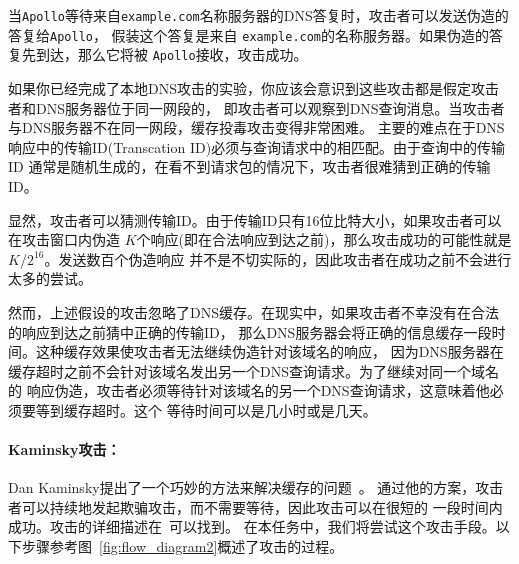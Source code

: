 当{\tt Apollo}等待来自{\tt example.com}名称服务器的DNS答复时，攻击者可以发送伪造的答复给{\tt Apollo}，
假装这个答复是来自 {\tt example.com}的名称服务器。如果伪造的答复先到达，那么它将被
{\tt Apollo}接收，攻击成功。


如果你已经完成了本地DNS攻击的实验，你应该会意识到这些攻击都是假定攻击者和DNS服务器位于同一网段的，
即攻击者可以观察到DNS查询消息。当攻击者与DNS服务器不在同一网段，缓存投毒攻击变得非常困难。
主要的难点在于DNS响应中的传输ID(Transcation ID)必须与查询请求中的相匹配。由于查询中的传输ID
通常是随机生成的，在看不到请求包的情况下，攻击者很难猜到正确的传输ID。


显然，攻击者可以猜测传输ID。由于传输ID只有16位比特大小，如果攻击者可以在攻击窗口内伪造
$K$个响应(即在合法响应到达之前)，那么攻击成功的可能性就是$K$/$2^{16}$。发送数百个伪造响应
并不是不切实际的，因此攻击者在成功之前不会进行太多的尝试。


然而，上述假设的攻击忽略了DNS缓存。在现实中，如果攻击者不幸没有在合法的响应到达之前猜中正确的传输ID，
那么DNS服务器会将正确的信息缓存一段时间。这种缓存效果使攻击者无法继续伪造针对该域名的响应，
因为DNS服务器在缓存超时之前不会针对该域名发出另一个DNS查询请求。为了继续对同一个域名的
响应伪造，攻击者必须等待针对该域名的另一个DNS查询请求，这意味着他必须要等到缓存超时。这个
等待时间可以是几小时或是几天。


\paragraph{Kaminsky攻击：} 
Dan Kaminsky提出了一个巧妙的方法来解决缓存的问题~\cite{dns:Kaminsky}。
通过他的方案，攻击者可以持续地发起欺骗攻击，而不需要等待，因此攻击可以在很短的
一段时间内成功。攻击的详细描述在~\cite{dns:Kaminsky,seedbook}可以找到。
在本任务中，我们将尝试这个攻击手段。以下步骤参考图~\ref{fig:flow_diagram2}概述了攻击的过程。


